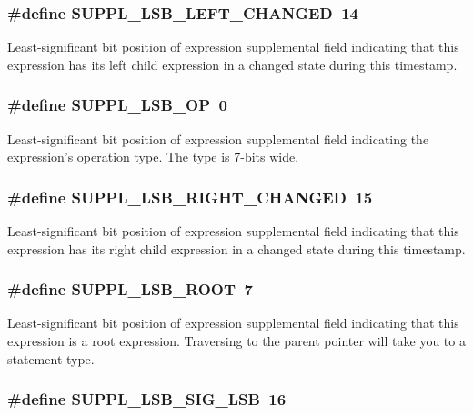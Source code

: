 \subsubsection{\setlength{\rightskip}{0pt plus 5cm}\#define SUPPL\_\-LSB\_\-LEFT\_\-CHANGED\ 14}\label{group__expr__suppl_a8}


Least-significant bit position of expression supplemental field indicating that this expression has its left child expression in a changed state during this timestamp. 
\subsubsection{\setlength{\rightskip}{0pt plus 5cm}\#define SUPPL\_\-LSB\_\-OP\ 0}\label{group__expr__suppl_a0}


Least-significant bit position of expression supplemental field indicating the expression's operation type. The type is 7-bits wide. 
\subsubsection{\setlength{\rightskip}{0pt plus 5cm}\#define SUPPL\_\-LSB\_\-RIGHT\_\-CHANGED\ 15}\label{group__expr__suppl_a9}


Least-significant bit position of expression supplemental field indicating that this expression has its right child expression in a changed state during this timestamp. 
\subsubsection{\setlength{\rightskip}{0pt plus 5cm}\#define SUPPL\_\-LSB\_\-ROOT\ 7}\label{group__expr__suppl_a1}


Least-significant bit position of expression supplemental field indicating that this expression is a root expression. Traversing to the parent pointer will take you to a statement type. 
\subsubsection{\setlength{\rightskip}{0pt plus 5cm}\#define SUPPL\_\-LSB\_\-SIG\_\-LSB\ 16}\label{group__expr__suppl_a10}


